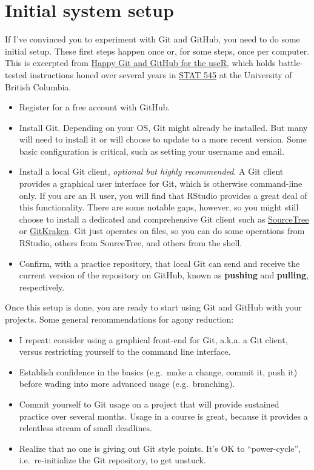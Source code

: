 \documentclass[12pt]{article}
\providecommand{\tightlist}{%
  \setlength{\itemsep}{0pt}\setlength{\parskip}{0pt}}
\begin{document}
\section{Initial system setup}\label{initial-system-setup}

If I've convinced you to experiment with Git and GitHub, you need to do
some initial setup. These first steps happen once or, for some steps,
once per computer. This is excerpted from
\href{http://happygitwithr.com}{Happy Git and GitHub for the useR},
which holds battle-tested instructions honed over several years in
\href{http://stat545.com}{STAT 545} at the University of British
Columbia.

\begin{itemize}
\item
  Register for a free account with GitHub.
\item
  Install Git. Depending on your OS, Git might already be installed. But
  many will need to install it or will choose to update to a more recent
  version. Some basic configuration is critical, such as setting your
  username and email.
\item
  Install a local Git client, \emph{optional but highly recommended}. A
  Git client provides a graphical user interface for Git, which is
  otherwise command-line only. If you are an R user, you will find that
  RStudio provides a great deal of this functionality. There are some
  notable gaps, however, so you might still choose to install a
  dedicated and comprehensive Git client such as
  \href{https://www.sourcetreeapp.com}{SourceTree} or
  \href{https://www.gitkraken.com}{GitKraken}. Git just operates on
  files, so you can do some operations from RStudio, others from
  SourceTree, and others from the shell.
\item
  Confirm, with a practice repository, that local Git can send and
  receive the current version of the repository on GitHub, known as
  \textbf{pushing} and \textbf{pulling}, respectively.
\end{itemize}

Once this setup is done, you are ready to start using Git and GitHub
with your projects. Some general recommendations for agony reduction:

\begin{itemize}
\tightlist
\item
  I repeat: consider using a graphical front-end for Git, a.k.a. a Git
  client, versus restricting yourself to the command line interface.
\item
  Establish confidence in the basics (e.g.~make a change, commit it,
  push it) before wading into more advanced usage (e.g.~branching).
\item
  Commit yourself to Git usage on a project that will provide sustained
  practice over several months. Usage in a course is great, because it
  provides a relentless stream of small deadlines.
\item
  Realize that no one is giving out Git style points. It's OK to
  ``power-cycle'', i.e.~re-initialize the Git repository, to get
  unstuck.
\end{itemize}
\end{document}
